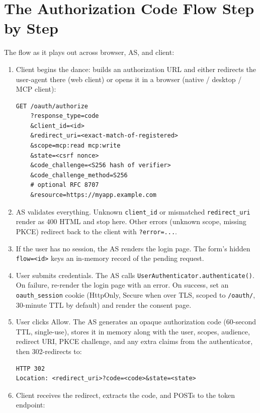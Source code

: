 \section{The Authorization Code Flow Step by Step}
\label{sec:as-flow}

The flow as it plays out across browser, AS, and client:

\begin{enumerate}
  \item Client begins the dance: builds an authorization URL and either redirects the user-agent there (web client) or opens it in a browser (native / desktop / MCP client):

\begin{lstlisting}[style=shell]
GET /oauth/authorize
    ?response_type=code
    &client_id=<id>
    &redirect_uri=<exact-match-of-registered>
    &scope=mcp:read mcp:write
    &state=<csrf nonce>
    &code_challenge=<S256 hash of verifier>
    &code_challenge_method=S256
    # optional RFC 8707
    &resource=https://myapp.example.com
\end{lstlisting}

  \item AS validates everything.  Unknown \texttt{client\_id} or mismatched \texttt{redirect\_uri} render as 400 HTML and stop here.  Other errors (unknown scope, missing PKCE) redirect back to the client with \texttt{?error=...}.
  \item If the user has no session, the AS renders the login page.  The form's hidden \texttt{flow=<id>} keys an in-memory record of the pending request.
  \item User submits credentials.  The AS calls \texttt{UserAuthenticator.authen\-ticate()}.  On failure, re-render the login page with an error.  On success, set an \texttt{oauth\_session} cookie (HttpOnly, Secure when over TLS, scoped to \texttt{/oauth/}, 30-minute TTL by default) and render the consent page.
  \item User clicks Allow.  The AS generates an opaque authorization code (60-second TTL, single-use), stores it in memory along with the user, scopes, audience, redirect URI, PKCE challenge, and any extra claims from the authenticator, then 302-redirects to:

\begin{lstlisting}[style=shell]
HTTP 302
Location: <redirect_uri>?code=<code>&state=<state>
\end{lstlisting}

  \item Client receives the redirect, extracts the code, and POSTs to the token endpoint:


\end{enumerate}
